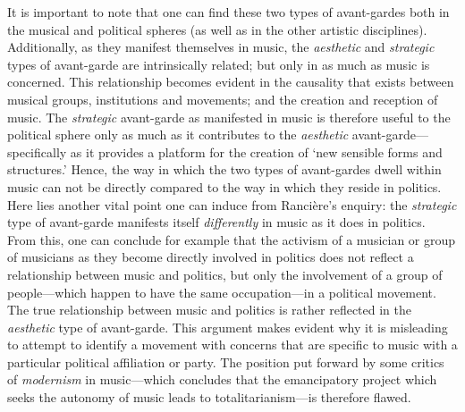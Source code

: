 It is important to note that one can find these two types of avant-gardes both in the musical and political spheres (as well as in the other artistic disciplines). Additionally, as they manifest themselves in music, the \emph{aesthetic} and \emph{strategic} types of avant-garde are intrinsically related; but only in as much as music is concerned.  This relationship becomes evident in the causality that exists between musical groups, institutions and movements; and the creation and reception of music. The \emph{strategic} avant-garde as manifested in music is therefore useful to the political sphere only as much as it contributes to the \emph{aesthetic} avant-garde---specifically as it provides a platform for the creation of `new sensible forms and structures.' Hence, the way in which the two types of avant-gardes dwell within music can not be directly compared to the way in which they reside in politics. Here lies another vital point one can induce from Ranci\`{e}re's enquiry: the \emph{strategic} type of avant-garde manifests itself \emph{differently} in music as it does in politics. From this, one can conclude for example that the activism of a musician or group of musicians as they become directly involved in politics does not reflect a relationship between music and politics, but only the involvement of a group of people---which happen to have the same occupation---in a political movement. The true relationship between music and politics is rather reflected in the \emph{aesthetic} type of avant-garde. This argument makes evident why it is misleading to attempt to identify a movement with concerns that are specific to music with a particular political affiliation or party. The position put forward by some critics of \emph{modernism} in music---which concludes that the emancipatory project which seeks the autonomy of music leads to totalitarianism---is therefore flawed.  

